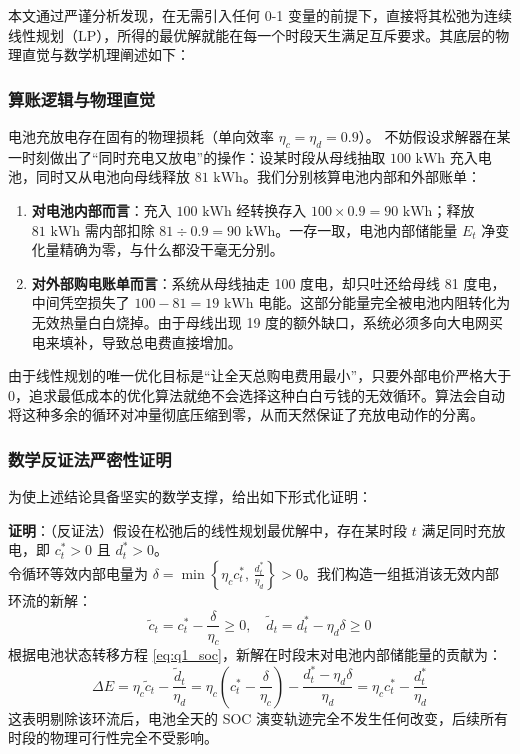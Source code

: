 \documentclass[withoutpreface]{cumcmthesis}
\begin{document}
本文通过严谨分析发现，在无需引入任何 0-1 变量的前提下，直接将其松弛为连续线性规划（LP），所得的最优解就能在每一个时段天生满足互斥要求。其底层的物理直觉与数学机理阐述如下：

\subsubsection{算账逻辑与物理直觉}
电池充放电存在固有的物理损耗（单向效率 $\eta_c = \eta_d = 0.9$）。
不妨假设求解器在某一时刻做出了“同时充电又放电”的操作：设某时段从母线抽取 $100\text{ kWh}$ 充入电池，同时又从电池向母线释放 $81\text{ kWh}$。我们分别核算电池内部和外部账单：
\begin{enumerate}
    \item \textbf{对电池内部而言}：充入 $100\text{ kWh}$ 经转换存入 $100 \times 0.9 = 90\text{ kWh}$；释放 $81\text{ kWh}$ 需内部扣除 $81 \div 0.9 = 90\text{ kWh}$。一存一取，电池内部储能量 $E_t$ 净变化量精确为零，与什么都没干毫无分别。
    \item \textbf{对外部购电账单而言}：系统从母线抽走 100 度电，却只吐还给母线 81 度电，中间凭空损失了 $100 - 81 = 19\text{ kWh}$ 电能。这部分能量完全被电池内阻转化为无效热量白白烧掉。由于母线出现 19 度的额外缺口，系统必须多向大电网买电来填补，导致总电费直接增加。
\end{enumerate}
由于线性规划的唯一优化目标是“让全天总购电费用最小”，只要外部电价严格大于 0，追求最低成本的优化算法就绝不会选择这种白白亏钱的无效循环。算法会自动将这种多余的循环对冲量彻底压缩到零，从而天然保证了充放电动作的分离。

\subsubsection{数学反证法严密性证明}
为使上述结论具备坚实的数学支撑，给出如下形式化证明：

\noindent\textbf{证明}：（反证法）假设在松弛后的线性规划最优解中，存在某时段 $t$ 满足同时充放电，即 $c_t^* > 0$ 且 $d_t^* > 0$。\\
令循环等效内部电量为 $\delta = \min\left\{ \eta_c c_t^*,\, \frac{d_t^*}{\eta_d} \right\} > 0$。我们构造一组抵消该无效内部环流的新解：
\begin{equation}
    \widetilde{c}_t = c_t^* - \frac{\delta}{\eta_c} \ge 0, \quad \widetilde{d}_t = d_t^* - \eta_d \delta \ge 0
\end{equation}
根据电池状态转移方程 \eqref{eq:q1_soc}，新解在时段末对电池内部储能量的贡献为：
\begin{equation}
    \Delta E = \eta_c \widetilde{c}_t - \frac{\widetilde{d}_t}{\eta_d} = \eta_c \left( c_t^* - \frac{\delta}{\eta_c} \right) - \frac{d_t^* - \eta_d \delta}{\eta_d} = \eta_c c_t^* - \frac{d_t^*}{\eta_d}
\end{equation}
这表明剔除该环流后，电池全天的 SOC 演变轨迹完全不发生任何改变，后续所有时段的物理可行性完全不受影响。
\end{document}
